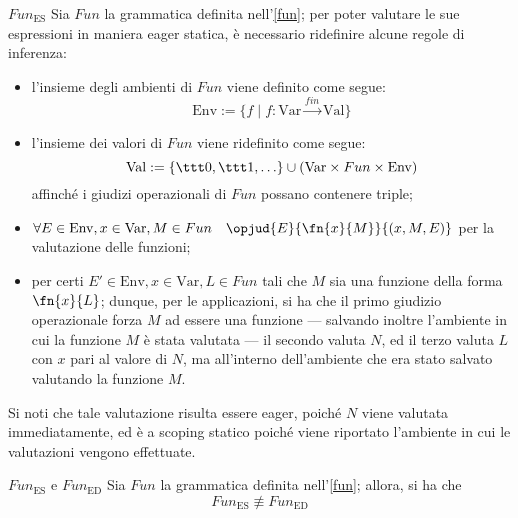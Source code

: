 \documentclass[a4paper, 12pt]{report}
\begin{document}
    \begin{framedobs}{$Fun_\mathrm{ES}$}
        Sia $Fun$ la grammatica definita nell'\cref{fun}; per poter valutare le sue espressioni in maniera eager statica, è necessario ridefinire alcune regole di inferenza:

        \begin{itemize}
            \item l'insieme degli ambienti di $Fun$ viene definito come segue: $$\mathrm{Env} := \{f \mid f : \mathrm{Var} \xrightarrow{fin} \mathrm{Val}\}$$
            \item l'insieme dei valori di $Fun$ viene ridefinito come segue: $$\mathrm{Val} := \{ \ttt 0, \ttt 1, \ldots \} \cup (\mathrm{Var} \times Fun \times \mathrm{Env})$$ affinché i giudizi operazionali di $Fun$ possano contenere triple;
            \item $\forall E \in \mathrm{Env}, x \in \mathrm{Var}, M \in Fun \quad \opjud{E}{\fn{x}{M}}{(x,M,E)}$ per la valutazione delle funzioni;
            \item {} per certi $E' \in \mathrm{Env}, x \in \mathrm{Var}, L \in Fun$ tali che $M$ sia una funzione della forma $\fn{x}{L}$; dunque, per le applicazioni, si ha che il primo giudizio operazionale forza $M$ ad essere una funzione --- salvando inoltre l'ambiente in cui la funzione $M$ è stata valutata --- il secondo valuta $N$, ed il terzo valuta $L$ con $x$ pari al valore di $N$, ma all'interno dell'ambiente che era stato salvato valutando la funzione $M$.
        \end{itemize}

        Si noti che tale valutazione risulta essere eager, poiché $N$ viene valutata immediatamente, ed è a scoping statico poiché viene riportato l'ambiente in cui le valutazioni vengono effettuate.
    \end{framedobs}

    \begin{framedlem}[label={fun lemma pt1}]{$Fun_\mathrm{ES}$ e $Fun_\mathrm{ED}$}
        Sia $Fun$ la grammatica definita nell'\cref{fun}; allora, si ha che $$Fun_\mathrm{ES} \not\equiv Fun_\mathrm{ED}$$
    \end{framedlem}
\end{document}
